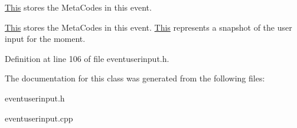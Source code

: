 \hyperlink{structThis}{This} stores the MetaCodes in this event. 

\hyperlink{structThis}{This} stores the MetaCodes in this event. \hyperlink{structThis}{This} represents a snapshot of the user input for the moment. 

Definition at line 106 of file eventuserinput.h.



The documentation for this class was generated from the following files:\begin{DoxyCompactItemize}
\item 
eventuserinput.h\item 
eventuserinput.cpp\end{DoxyCompactItemize}
